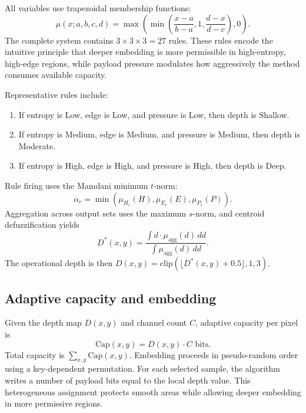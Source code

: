 All variables use trapezoidal membership functions:
\begin{equation}
\mu(x;a,b,c,d)=\max\left(\min\left(\frac{x-a}{b-a},1,\frac{d-x}{d-c}\right),0\right).
\end{equation}
The complete system contains \(3 \times 3 \times 3 = 27\) rules. These rules encode the intuitive principle that deeper embedding is more permissible in high-entropy, high-edge regions, while payload pressure modulates how aggressively the method consumes available capacity.

Representative rules include:
\begin{enumerate}[leftmargin=1.2cm]
    \item If entropy is Low, edge is Low, and pressure is Low, then depth is Shallow.
    \item If entropy is Medium, edge is Medium, and pressure is Medium, then depth is Moderate.
    \item If entropy is High, edge is High, and pressure is High, then depth is Deep.
\end{enumerate}

Rule firing uses the Mamdani minimum \(t\)-norm:
\begin{equation}
\alpha_r=\min\left(\mu_{H_r}(H),\mu_{E_r}(E),\mu_{P_r}(P)\right).
\end{equation}
Aggregation across output sets uses the maximum \(s\)-norm, and centroid defuzzification yields
\begin{equation}
D^*(x,y)=\frac{\int d \cdot \mu_{\text{agg}}(d)\,dd}{\int \mu_{\text{agg}}(d)\,dd}.
\end{equation}
The operational depth is then \(D(x,y)=\mathrm{clip}(\lfloor D^*(x,y)+0.5 \rfloor,1,3)\).

\subsection{Adaptive capacity and embedding}
Given the depth map \(D(x,y)\) and channel count \(C\), adaptive capacity per pixel is
\begin{equation}
\mathrm{Cap}(x,y)=D(x,y)\cdot C \text{ bits}.
\end{equation}
Total capacity is \(\sum_{x,y}\mathrm{Cap}(x,y)\). Embedding proceeds in pseudo-random order using a key-dependent permutation. For each selected sample, the algorithm writes a number of payload bits equal to the local depth value. This heterogeneous assignment protects smooth areas while allowing deeper embedding in more permissive regions.

